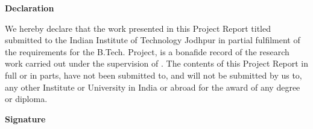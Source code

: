 \begin{flushright}
\huge{\textbf{Declaration}}
\end{flushright}
We hereby declare that the work presented in this Project Report titled \ttitle{} submitted to the Indian Institute of Technology Jodhpur in partial fulfilment of the requirements for the B.Tech. Project, is a bonafide record of the research work carried out under the supervision of \supname. The contents of this Project Report in full or in parts, have not been submitted to, and will not be submitted by us to, any other Institute or University in India or abroad for the award of any degree or diploma.
\vspace{2cm}
\begin{flushright}
\large{\textbf{Signature}}\\
\emph{\authorname}\\
\rn
\end{flushright}